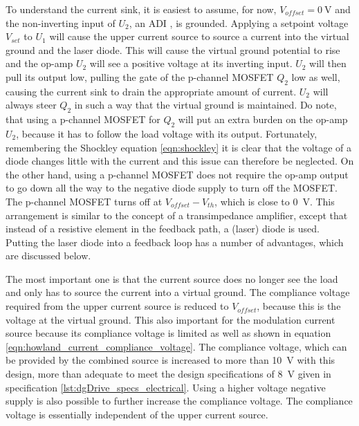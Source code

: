 To understand the current sink, it is easiest to assume, for now, $V_{offset} = \qty{0}{\V}$ and the non-inverting input of $U_2$, an ADI , is grounded. Applying a setpoint voltage $V_{set}$ to $U_1$ will cause the upper current source to source a current into the virtual ground and the laser diode. This will cause the virtual ground potential to rise and the op-amp $U_2$ will see a positive voltage at its inverting input. $U_2$ will then pull its output low, pulling the gate of the p-channel MOSFET $Q_2$ low as well, causing the current sink to drain the appropriate amount of current. $U_2$ will always steer $Q_2$ in such a way that the virtual ground is maintained. Do note, that using a p-channel MOSFET for $Q_2$ will put an extra burden on the op-amp $U_2$, because it has to follow the load voltage with its output. Fortunately, remembering the Shockley equation \ref{eqn:shockley} it is clear that the voltage of a diode changes little with the current and this issue can therefore be neglected. On the other hand, using a p-channel MOSFET does not require the op-amp output to go down all the way to the negative diode supply to turn off the MOSFET. The p-channel MOSFET turns off at $V_{offset}-V_{th}$, which is close to \qty{0}{\V}. This arrangement is similar to the concept of a transimpedance amplifier, except that instead of a resistive element in the feedback path, a (laser) diode is used. Putting the laser diode into a feedback loop has a number of advantages, which are discussed below.

The most important one is that the current source does no longer see the load and only has to source the current into a virtual ground. The compliance voltage required from the upper current source is reduced to $V_{offset}$, because this is the voltage at the virtual ground. This also important for the modulation current source because its compliance voltage is limited as well as shown in equation \ref{eqn:howland_current_compliance_voltage}. The compliance voltage, which can be provided by the combined source is increased to more than \qty{10}{\V} with this design, more than adequate to meet the design specifications of \qty{8}{\V} given in specification \ref{lst:dgDrive_specs_electrical}. Using a higher voltage negative supply is also possible to further increase the compliance voltage. The compliance voltage is essentially independent of the upper current source.

